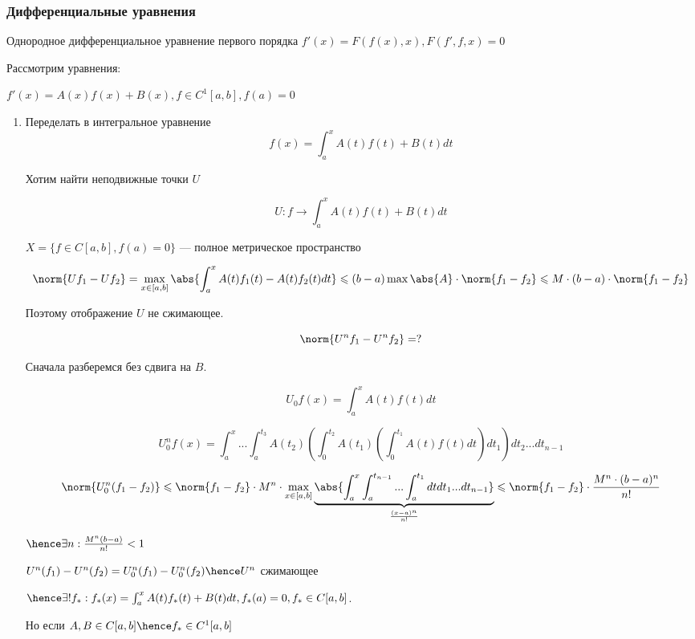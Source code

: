 \subsubsection*{Дифференциальные уравнения}

Однородное дифференциальное уравнение первого порядка $f'(x) = F(f(x), x), F(f', f, x) = 0$

Рассмотрим уравнения:

$f'(x) = A(x) f(x) + B(x), f \in C^1[a, b], f(a) = 0$

\begin{enumerate}
    \item Переделать в интегральное уравнение 
    \[
        f(x) = \int_a^x A(t)f(t)+B(t) dt
    \]

    Хотим найти неподвижные точки $U$

    \[
        U : f \to \int_a ^ x A(t) f(t) + B(t) dt
    \]

    $X = \{ f \in C[a, b] , f(a) = 0 \}$ --- полное метрическое пространство

    \[
        \norm{Uf_1 - Uf_2} = \max_{x \in [a, b]} \abs{\int_a^x A(t)f_1(t) - A(t) f_2(t) dt} \leqslant (b - a) \max \abs{A} \cdot \norm{f_1 - f_2} \leqslant M \cdot (b - a) \cdot \norm{f_1 - f_2}
    \]

    Поэтому отображение $U$ не сжимающее.

    \[
        \norm{U ^ n f_1 - U^n f_2} = ?
    \]

Сначала разберемся без сдвига на $B$.

    \[
        U_0 f(x) = \int_a ^ x A(t) f(t) dt
    \]

    \[
        U_0 ^ n f(x) =  \int_a^x  ... \int_a^{t_3} A(t_2) (\int_0^{t_2} A(t_1) (\int_0^{t_1} A(t) f(t) dt ) dt_1) dt_2 ... dt_{n - 1}
    \]

    \[
        \norm{U_0 ^ n (f_1 - f_2) } \leqslant \norm{f_1 - f_2} \cdot M ^ n \cdot \max_{x \in [a,b]} \underbrace{\abs{ \int_a^x \int_a^{t_{n - 1}} ... \int_a^{t_1} dt dt_1 ... dt_{n-1}}}_{\frac{(x - a) ^ n}{n !}} \leqslant \norm{f_1 - f_2} \cdot \frac{M ^ n \cdot (b - a) ^ n}{n !}
    \]

    $\hence \exists n : \frac{M ^ n (b -a)}{n !} < 1$

    $
        U ^ n (f_1) - U^n(f_2) = U_0 ^ n (f_1) - U_0 ^ n (f_2) \hence U ^ n
    $ сжимающее

    $\hence \exists! f_* : f_*(x) = \int_a^x A(t) f_*(t) + B(t) dt, f_*(a) = 0, f_* \in C[a, b]$.
    
    Но если $A, B \in C[a, b] \hence f_* \in C^1 [a, b]$
\end{enumerate}



